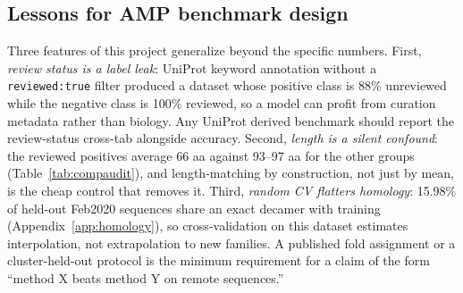
\subsection{Lessons for AMP benchmark design}
Three features of this project generalize beyond the specific numbers.
First, \emph{review status is a label leak}: UniProt keyword annotation
without a \texttt{reviewed:true} filter produced a dataset whose positive
class is 88\% unreviewed while the negative class is 100\% reviewed, so a
model can profit from curation metadata rather than biology. Any UniProt
derived benchmark should report the review-status cross-tab alongside
accuracy. Second, \emph{length is a silent confound}: the reviewed
positives average 66 aa against 93--97 aa for the other groups
(Table~\ref{tab:compaudit}), and length-matching by construction, not just
by mean, is the cheap control that removes it. Third, \emph{random CV
flatters homology}: 15.98\% of held-out Feb2020 sequences share an exact
decamer with training (Appendix~\ref{app:homology}), so cross-validation
on this dataset estimates interpolation, not extrapolation to new
families. A published fold assignment or a cluster-held-out protocol is
the minimum requirement for a claim of the form ``method X beats method Y
on remote sequences.''
